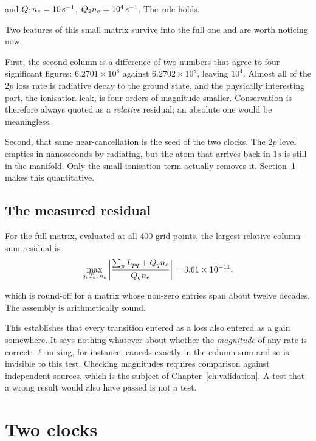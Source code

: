 \noindent and $Q_1n_e = \SI{10}{\per\second}$, $Q_2n_e = \SI{e4}{\per\second}$.
The rule holds.

Two features of this small matrix survive into the full one and are worth
noticing now.

First, the second column is a difference of two numbers that agree to four
significant figures: $6.2701\times10^{8}$ against $6.2702\times10^{8}$, leaving
$10^{4}$. Almost all of the $2p$ loss rate is radiative decay to the ground
state, and the physically interesting part, the ionisation leak, is four
orders of magnitude smaller. Conservation is therefore always quoted as a
\emph{relative} residual; an absolute one would be meaningless.

Second, that same near-cancellation is the seed of the two clocks. The $2p$
level empties in nanoseconds by radiating, but the atom that arrives back in
$1s$ is still in the manifold. Only the small ionisation term actually removes
it. Section~\ref{sec:two_clocks} makes this quantitative.

\subsection{The measured residual}

For the full matrix, evaluated at all 400 grid points, the largest relative
column-sum residual is
\begin{equation}
  \max_{q,\,T_e,\,n_e}
  \left|\frac{\sum_p L_{pq} + Q_qn_e}{Q_qn_e}\right|
  = 3.61\times10^{-11},
  \label{eq:conservation_measured}
\end{equation}

\noindent which is round-off for a matrix whose non-zero entries span about
twelve decades. The assembly is arithmetically sound.

This establishes that every transition entered as a loss also entered as a
gain somewhere. It says nothing whatever about whether the \emph{magnitude} of any
rate is correct: $\ell$-mixing, for instance, cancels exactly in the column sum
and so is invisible to this test. Checking magnitudes requires comparison
against independent sources, which is the subject of
Chapter~\ref{ch:validation}. A test that a wrong result would also have passed
is not a test.

\section{Two clocks}
\label{sec:two_clocks}

